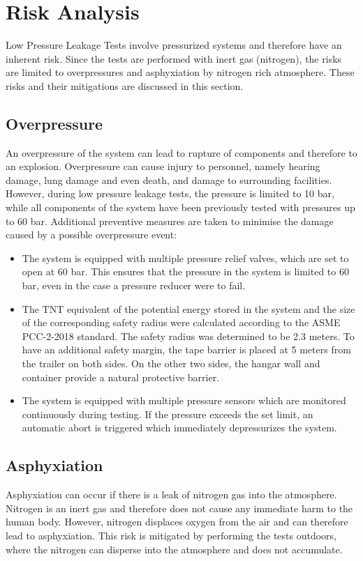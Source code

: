 \documentclass{article}
\begin{document}
\section{Risk Analysis}
Low Pressure Leakage Tests involve pressurized systems and therefore have an inherent risk. Since the tests are performed with inert gas (nitrogen), the risks are limited to overpressures and asphyxiation by nitrogen rich atmosphere. These risks and their mitigations are discussed in this section.
\subsection{Overpressure}
An overpressure of the system can lead to rupture of components and therefore to an explosion. Overpressure can cause injury to personnel, namely hearing damage, lung damage and even death, and damage to surrounding facilities. However, during low pressure leakage tests, the pressure is limited to 10 bar, while all components of the system have been previously tested with pressures up to 60 bar. Additional preventive measures are taken to minimise the damage caused by a possible overpressure event:
\begin{itemize}
    \item The system is equipped with multiple pressure relief valves, which are set to open at 60 bar. This ensures that the pressure in the system is limited to 60 bar, even in the case a pressure reducer were to fail.
    \item The TNT equivalent of the potential energy stored in the system and the size of the corresponding safety radius were calculated according to the ASME PCC-2-2018 standard. The safety radius was determined to be 2.3 meters. To have an additional safety margin, the tape barrier is placed at 5 meters from the trailer on both sides. On the other two sides, the hangar wall and container provide a natural protective barrier.
    \item The system is equipped with multiple pressure sensors which are monitored continuously during testing. If the pressure exceeds the set limit, an automatic abort is triggered which immediately depressurizes the system.
\end{itemize}
\subsection{Asphyxiation}
Asphyxiation can occur if there is a leak of nitrogen gas into the atmosphere. Nitrogen is an inert gas and therefore does not cause any immediate harm to the human body. However, nitrogen displaces oxygen from the air and can therefore lead to asphyxiation. This risk is mitigated by performing the tests outdoors, where the nitrogen can disperse into the atmosphere and does not accumulate.
\end{document}
